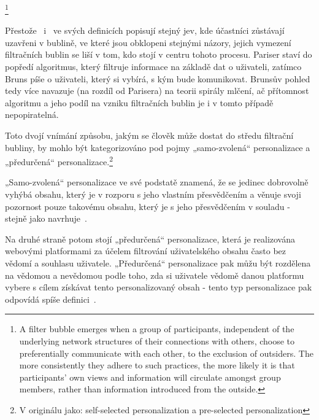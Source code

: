     \footnote{A filter bubble emerges when a group of participants, independent of the underlying network
    structures of their connections with others, choose to preferentially communicate with each other, to
    the exclusion of outsiders. The more consistently they adhere to such practices, the more likely it is that
    participants’ own views and information will circulate amongst group members, rather than
    information introduced from the outside.}~\citep{Bruns17}
    
    
    Přestože~\cite{Pariser2011} i~\cite{Bruns} ve svých definicích popisují stejný jev, kde účastníci zůstávají uzavřeni v bublině, ve které jsou obklopeni stejnými názory, jejich vymezení filtračních bublin se liší v tom, kdo stojí v centru tohoto procesu. Pariser staví do popředí algoritmus, který filtruje informace na základě dat o uživateli, zatímco Bruns píše o uživateli, který si vybírá, s kým bude komunikovat. Brunsův pohled tedy více navazuje (na rozdíl od Parisera) na teorii spirály mlčení, ač přítomnost algoritmu a jeho podíl na vzniku filtračních bublin je i v tomto případě nepopiratelná. 
    
    \setlength\parskip{0mm}
    
    Toto dvojí vnímání způsobu, jakým se člověk může dostat do středu filtrační bubliny, by mohlo být kategorizováno pod pojmy „samo-zvolená“ personalizace a „předurčená“ personalizace.\footnote{V originálu jako: self-selected personalization a pre-selected personalization} 
    
    „Samo-zvolená“ personalizace ve své podstatě znamená, že se jedinec dobrovolně vyhýbá obsahu, který je v rozporu s jeho vlastním přesvědčením a věnuje svoji pozornost pouze takovému obsahu, který je s jeho přesvědčením v souladu - stejně jako navrhuje~\cite{Bruns17}. 
    
    Na druhé straně potom stojí „předurčená“ personalizace, která je realizována webovými platformami za účelem filtrování uživatelského obsahu často bez vědomí a souhlasu uživatele. „Předurčená“ personalizace pak můžu být rozdělena na vědomou a nevědomou podle toho, zda si uživatele vědomě danou platformu vybere s cílem získávat tento personalizovaný obsah - tento typ personalizace pak odpovídá spíše definici~\cite{Pariser2011}.~\citep{BrunsSpringer}
    
